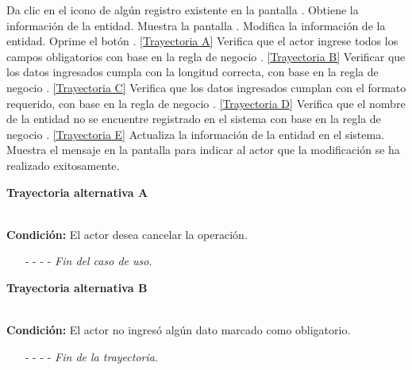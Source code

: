 	\begin{UCtrayectoria}
		\UCpaso[\UCactor] Da clic en el icono \editar de algún registro existente en la pantalla .
		\UCpaso[\UCsist] Obtiene la información de la entidad.
		\UCpaso[\UCsist] Muestra la pantalla . \label{CU7.2-P4}
		\UCpaso[\UCactor] Modifica la información de la entidad. \label{CU7.2-P5}
		\UCpaso[\UCactor] Oprime el botón . \hyperlink{CU7-2:TAA}{[Trayectoria A]}
		\UCpaso[\UCsist] Verifica que el actor ingrese todos los campos obligatorios con base en la regla de negocio . \hyperlink{CU7-2:TAB}{[Trayectoria B]}
		\UCpaso[\UCsist] Verificar que los datos ingresados cumpla con la longitud correcta, con base en la regla de negocio . \hyperlink{CU7-2:TAC}{[Trayectoria C]}
		\UCpaso[\UCsist] Verifica que los datos ingresados cumplan con el formato requerido, con base en la regla de negocio . \hyperlink{CU7-2:TAD}{[Trayectoria D]}
		\UCpaso[\UCsist] Verifica que el nombre de la entidad no se encuentre registrado en el sistema con base en la regla de negocio . \hyperlink{CU7-2:TAE}{[Trayectoria E]} 
		\UCpaso[\UCsist] Actualiza la información de la entidad en el sistema.
		\UCpaso[\UCsist] Muestra el mensaje  en la pantalla  para indicar al actor que la modificación se ha realizado exitosamente.
	\end{UCtrayectoria}		
\hypertarget{CU7-2:TAA}{\textbf{Trayectoria alternativa A}}\\
\noindent \textbf{Condición:} El actor desea cancelar la operación.
\begin{enumerate}
	\UCpaso[\UCactor] Solicita cancelar la operación oprimiendo el botón  de la pantalla 
	\UCpaso[\UCsist] Muestra la pantalla .
	\item[- -] - - {\em {Fin del caso de uso}}.%
\end{enumerate}
\hypertarget{CU7-2:TAB}{\textbf{Trayectoria alternativa B}}\\
\noindent \textbf{Condición:} El actor no ingresó algún dato marcado como obligatorio.
\begin{enumerate}
	\UCpaso[\UCsist] Muestra el mensaje  señalando el campo que presenta el error en la pantalla .
	\UCpaso Regresa al paso \ref{CU7.2-P5} de la trayectoria principal.
	\item[- -] - - {\em {Fin de la trayectoria}}.%
\end{enumerate}
